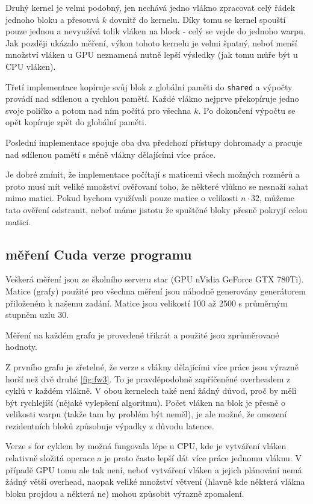 \documentclass[11pt, fleqn]{article}
\begin{document}
Druhý kernel je velmi podobný, jen nechává jedno vlákno zpracovat celý řádek jednoho bloku a přesouvá $k$ dovnitř do kernelu. Díky tomu se kernel spouští pouze jednou a nevyužívá tolik vláken na block - celý se vejde do jednoho warpu. Jak později ukázalo měření, výkon tohoto kernelu je velmi špatný, neboť menší množství vláken u GPU neznamená nutně lepší výsledky (jak tomu můře být u CPU vláken).

Třetí implementace kopíruje svůj blok z globální paměti do \lstinline{shared} a výpočty provádí nad sdílenou a rychlou pamětí. Každé vlákno nejprve překopíruje jedno svoje políčko a potom nad ním počítá pro všechna $k$. Po dokončení výpočtu se opět kopíruje zpět do globální paměti.

Poslední implementace spojuje oba dva předchozí přístupy dohromady a pracuje nad sdílenou pamětí s méně vlákny dělajícími více práce.


Je dobré zmínit, že implementace počítají s maticemi všech možných rozměrů a proto musí mít veliké množství ověřovaní toho, že některé vlůkno se nesnaží sahat mimo matici. Pokud bychom využívali pouze matice o velikosti $n \cdot 32$, můžeme tato ověření odstranit, neboť máme jistotu že spuštěné bloky přesně pokryjí celou matici.

\subsection{měření Cuda verze programu}

Veškerá měření jsou ze školního serveru star (GPU nVidia GeForce GTX 780Ti). Matice (grafy) použité pro všechna měření jsou náhodně generovány generátorem přiloženém k našemu zadání. Matice jsou velikostí 100 až 2500 s průměrným stupněm uzlu 30.

Měření na každém grafu je provedené třikrát a použité jsou zprůměrované hodnoty.

Z prvního grafu je zřetelné, že verze s vlákny dělajícími více práce jsou výrazně horší než dvě druhé \ref{fig:fw3}. To je pravděpodobně zapříčeněné overheadem z cyklů v každém vlákně. V obou kernelech také není žádný důvod, proč by měli být rychlejíší (nějaké vylepšení algoritmu). Počet vláken na blok je přesně o velikosti warpu (takže tam by problém být neměl), je ale možné, že omezení rezidentních bloků způsobuje výpadky z důvodu latence.

Verze s for cyklem by možná fungovala lépe u CPU, kde je vytváření vláken relativně složitá operace a je proto často lepší dát více práce jednomu vláknu. V případě GPU tomu ale tak není, neboť vytváření vláken a jejich plánování nemá žádný větší overhead, naopak veliké množství větvení (hlavně kde některá vlákna bloku projdou a některá ne) mohou způsobit výrazně zpomalení.
\end{document}
